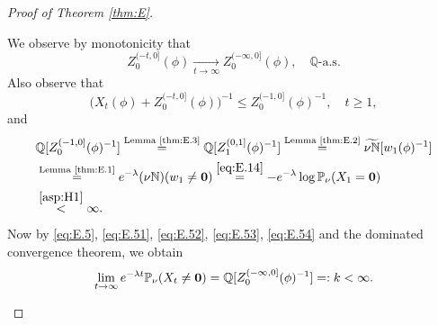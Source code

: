 \documentclass[12pt,a4paper]{amsart}
\numberwithin{equation}{section}
\theoremstyle{plain}
\theoremstyle{definition}
\theoremstyle{remark}
\newenvironment{proof*}[1][\proofname]{
	\renewcommand\qedsymbol{\rule{3mm}{3mm}}
	\begin{proof}[#1]}{\end{proof}}
\begin{document}
\begin{proof}[Proof of Theorem \ref{thm:E}]
\begin{proof*}
	We observe by monotonicity that
\begin{equation} \label{eq:E.52}
	Z^{(-t,0]}_0(\phi)
	\xrightarrow[t\to \infty]{} Z^{(-\infty,0]}_0(\phi),
	\quad \mathbb Q\text{-a.s.}
\end{equation}
	Also observe that
	\begin{equation}\label{eq:E.53}
	\big(X_t(\phi) + Z^{(-t,0]}_0(\phi)\big)^{-1}
	\leq Z^{(-1,0]}_0(\phi)^{-1},
	\quad t\geq 1,
	\end{equation}
	and
	\begin{align}
	&\mathbb Q [Z^{(-1,0]}_0(\phi)^{-1}]
	\overset{\text{Lemma \ref{thm:E.3}}} = \mathbb Q [Z^{(0,1]}_1(\phi)^{-1}]
	\overset{\text{Lemma \ref{thm:E.2}}}= \widetilde {\nu\mathbb N} [w_1(\phi)^{-1}]
	\\&\overset{\text{Lemma \ref{thm:E.1}}}= e^{-\lambda}(\nu\mathbb N) (w_1\neq \mathbf 0) 
	\overset{\eqref{eq:E.14}} = -e^{-\lambda} \log \mathbb P_{\nu}(X_1 = \mathbf 0) 
	\\& \label{eq:E.54} \overset{\eqref{asp:H1}}< \infty.
	\end{align}
	Now by \eqref{eq:E.5}, \eqref{eq:E.51}, \eqref{eq:E.52}, \eqref{eq:E.53}, \eqref{eq:E.54} and the dominated  convergence theorem, we obtain
	\begin{equation}\label{eq:E.55}
	 \lim_{t\to\infty} e^{-\lambda t}\mathbb P_{\nu}(X_t \neq \mathbf 0)
	 =\mathbb Q[Z^{(-\infty,0]}_0(\phi)^{-1}]
	 =:k<\infty.
	 \qedhere
	\end{equation}
\end{proof*}
	\begin{proof*}

\end{proof*}
\end{proof}
\end{document}
